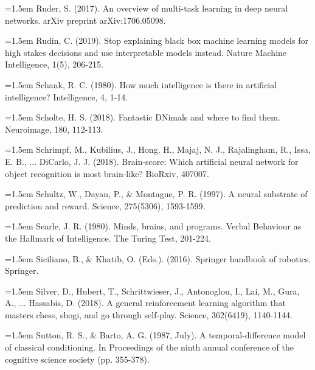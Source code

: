 \hangindent=1.5em
Ruder, S. (2017).
An overview of multi-task learning in deep neural networks.
arXiv preprint arXiv:1706.05098.
\par

\hangindent=1.5em
Rudin, C. (2019).
Stop explaining black box machine learning models for high stakes
decisions and use interpretable models instead.
Nature Machine Intelligence, 1(5), 206-215.
\par

\hangindent=1.5em
Schank, R. C. (1980).
How much intelligence is there in artificial intelligence?
Intelligence, 4, 1-14.
\par

\hangindent=1.5em
Scholte, H. S. (2018).
Fantastic DNimals and where to find them.
Neuroimage, 180, 112-113.
\par

\hangindent=1.5em
Schrimpf, M., Kubilius, J., Hong, H., Majaj, N. J.,
Rajalingham, R., Issa, E. B., ... DiCarlo, J. J. (2018).
Brain-score: Which artificial neural network for object recognition
is most brain-like?
BioRxiv, 407007.
\par

\hangindent=1.5em
Schultz, W., Dayan, P., \& Montague, P. R. (1997).
A neural substrate of prediction and reward.
Science, 275(5306), 1593-1599.
\par

\hangindent=1.5em
Searle, J. R. (1980).
Minds, brains, and programs.
Verbal Behaviour as the Hallmark of Intelligence.
The Turing Test, 201-224.
\par

\hangindent=1.5em
Siciliano, B., \& Khatib, O. (Eds.). (2016).
Springer handbook of robotics.
Springer.
\par

\hangindent=1.5em
Silver, D., Hubert, T., Schrittwieser, J., Antonoglou, I.,
Lai, M., Gura, A., ... Hassabis, D. (2018).
A general reinforcement learning algorithm that masters chess,
shogi, and go through self-play.
Science, 362(6419), 1140-1144.
\par

\hangindent=1.5em
Sutton, R. S., \& Barto, A. G. (1987, July).
A temporal-difference model of classical conditioning.
In Proceedings of the ninth annual conference of the cognitive
science society (pp. 355-378).
\par

